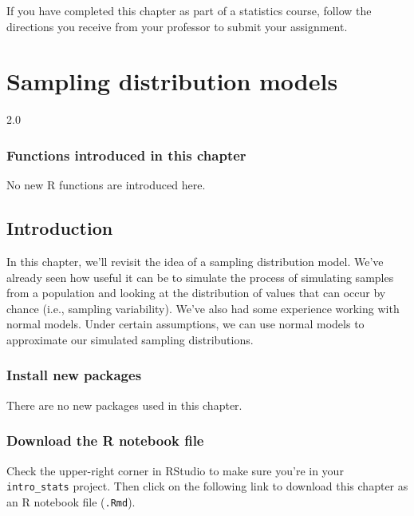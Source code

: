 \documentclass[
]{book}
\begin{document}
If you have completed this chapter as part of a statistics course, follow the directions you receive from your professor to submit your assignment.

\hypertarget{samp-dist-models}{%
\chapter{Sampling distribution models}\label{samp-dist-models}}

2.0

\hypertarget{functions-introduced-in-this-chapter-13}{%
\subsection*{Functions introduced in this chapter}\label{functions-introduced-in-this-chapter-13}}

No new R functions are introduced here.

\hypertarget{samp-dist-models-intro}{%
\section{Introduction}\label{samp-dist-models-intro}}

In this chapter, we'll revisit the idea of a sampling distribution model. We've already seen how useful it can be to simulate the process of simulating samples from a population and looking at the distribution of values that can occur by chance (i.e., sampling variability). We've also had some experience working with normal models. Under certain assumptions, we can use normal models to approximate our simulated sampling distributions.

\hypertarget{samp-dist-models-install}{%
\subsection{Install new packages}\label{samp-dist-models-install}}

There are no new packages used in this chapter.

\hypertarget{samp-dist-models-download}{%
\subsection{Download the R notebook file}\label{samp-dist-models-download}}

Check the upper-right corner in RStudio to make sure you're in your \texttt{intro\_stats} project. Then click on the following link to download this chapter as an R notebook file (\texttt{.Rmd}).
\end{document}
